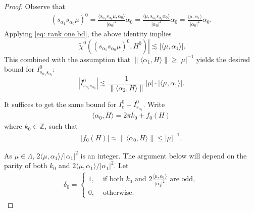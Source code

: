 \documentclass{amsart}
\numberwithin{equation}{section}
\numberwithin{equation}{section}
\begin{document}
\begin{proof}
Observe that 
\begin{align*}
(s_{\alpha_1}s_{\alpha_0}\mu)^0=\frac{\langle s_{\alpha_1}s_{\alpha_0}\mu, \alpha_0  \rangle}{|\alpha_0|^2}  \alpha_0
    =\frac{\langle \mu, s_{\alpha_0}s_{\alpha_1}\alpha_0  \rangle}{|\alpha_0|^2}  \alpha_0
    =\frac{\langle \mu, \alpha_1  \rangle}{|\alpha_0|^2}  \alpha_0.
\end{align*}
Applying \eqref{eq: rank one bd}, the above identity implies 
$$|\widetilde{\chi}^0({(s_{\alpha_1}s_{\alpha_0}\mu)^0}, H^0)|\lesssim |\langle \mu, \alpha_1  \rangle|.$$
This combined with the assumption that $\|\langle\alpha_1, H\rangle\|\geq |\mu|^{-1}$ yields the desired bound for $I^0_{s_{\alpha_1}s_{\alpha_0}}$:
$$|I^0_{s_{\alpha_1}s_{\alpha_0}}|\lesssim \frac{1}{\|\langle\alpha_2, H\rangle\|}|\mu|\cdot |\langle \mu, \alpha_1  \rangle|.$$

It suffices to get the same bound for $I^0_{e}+I^0_{s_{\alpha_1}}$. Write 
\begin{align}\label{eq: alpha0H}
    \langle\alpha_0, H\rangle=2\pi k_0+f_0(H)
\end{align}
where $k_0\in\mathbb{Z}$, such that 
\begin{align}\label{eq: f0 case 2}
    |f_0(H)|\approx \|\langle\alpha_0, H\rangle\|\leq |\mu|^{-1}.
\end{align}


As $\mu\in\Lambda$, $2\langle\mu,\alpha_1\rangle/|\alpha_1|^2$ is an integer. 
The argument below will depend on the parity of both $k_0$ and $2\langle\mu,\alpha_1\rangle/|\alpha_1|^2$. Let 
\begin{align}\label{eq: def delta case 2}
    \delta_0=\left\{\begin{array}{ll}
    1, & \text{ if both }k_0 \text{ and } 2\frac{\langle\mu,\alpha_1\rangle}{|\alpha_1|^2}\text{ are odd}, \\
    0, & \text{ otherwise}.
\end{array}\right.
\end{align}



\end{proof}
\end{document}
